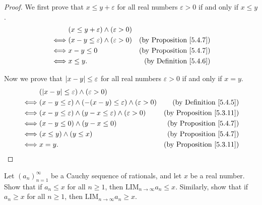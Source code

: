 \begin{proof}
We first prove that \(x \leq y + \varepsilon\) for all real numbers \(\varepsilon > 0\) if and only if \(x \leq y\).
\begin{align*}
& (x \leq y + \varepsilon) \land (\varepsilon > 0) \\
\iff & (x - y \leq \varepsilon) \land (\varepsilon > 0) & \text{(by Proposition \ref{5.4.7})} \\
\iff & x - y \leq 0 & \text{(by Proposition \ref{5.4.7})} \\
\iff & x \leq y. & \text{(by Definition \ref{5.4.6})}
\end{align*}

Now we prove that \(\abs*{x - y} \leq \varepsilon\) for all real numbers \(\varepsilon > 0\) if and only if \(x = y\).
\begin{align*}
& (\abs*{x - y} \leq \varepsilon) \land (\varepsilon > 0) \\
\iff & (x - y \leq \varepsilon) \land (-(x - y) \leq \varepsilon) \land (\varepsilon > 0) & \text{(by Definition \ref{5.4.5})} \\
\iff & (x - y \leq \varepsilon) \land (y - x \leq \varepsilon) \land (\varepsilon > 0) & \text{(by Proposition \ref{5.3.11})} \\
\iff & (x - y \leq 0) \land (y - x \leq 0) & \text{(by Proposition \ref{5.4.7})} \\
\iff & (x \leq y) \land (y \leq x) & \text{(by Proposition \ref{5.4.7})} \\
\iff & x = y. & \text{(by Proposition \ref{5.3.11})}
\end{align*}
\end{proof}

\begin{exercise}\label{ex 5.4.8}
Let \((a_n)_{n = 1}^{\infty}\) be a Cauchy sequence of rationals, and let \(x\) be a real number.
Show that if \(a_n \leq x\) for all \(n \geq 1\), then \(\text{LIM}_{n \to \infty} a_n \leq x\).
Similarly, show that if \(a_n \geq x\) for all \(n \geq 1\), then \(\text{LIM}_{n \to \infty} a_n \geq x\).
\end{exercise}

